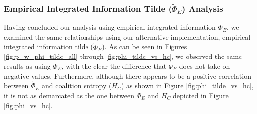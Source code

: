 \documentclass[a4paper,11pt]{article}
\begin{document}
\subsubsection{Empirical Integrated Information Tilde ($\widetilde{\Phi}_E$) Analysis}
\label{sec:app:snn:res:phi-tilde}
Having concluded our analysis using empirical integrated information $\Phi_E$, we examined the same relationships using our alternative implementation, empirical integrated information tilde ($\widetilde{\Phi}_E$). As can be seen in Figures \ref{fig:p_w_phi_tilde_all} through \ref{fig:phi_tilde_vs_hc}, we observed the same results as using $\Phi_E$, with the clear the difference that $\widetilde{\Phi}_E$ does not take on negative values. Furthermore, although there appears to be a positive correlation between $\widetilde{\Phi}_E$ and coalition entropy ($H_C$) as shown in Figure \ref{fig:phi_tilde_vs_hc}, it is not as demarcated as the one between $\Phi_E$ and $H_C$ depicted in Figure \ref{fig:phi_vs_hc}.
\end{document}
